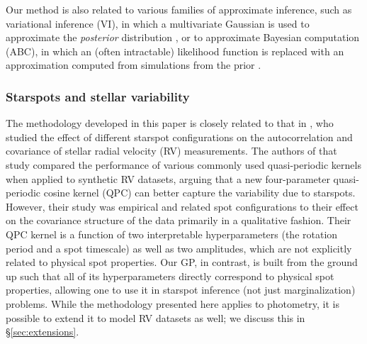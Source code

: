 \documentclass[modern,linenumbers]{aastex62}
\begin{document}
Our method is also related to various families of approximate inference, such as
variational inference (VI), in which a multivariate Gaussian is used to
approximate the \emph{posterior} distribution \citep[e.g,][]{Blei2016},
or to approximate Bayesian
computation (ABC), in which an (often intractable) likelihood function is
replaced with an approximation computed from simulations from the prior
\citep[e.g.,][]{Beaumont2019}.

\subsubsection{Starspots and stellar variability}

The methodology developed in this paper is closely related to that in
\citet{Perger2020}, who studied the effect of different starspot
configurations on the autocorrelation and covariance of stellar
radial velocity (RV) measurements. The authors of that study compared the
performance of various commonly used quasi-periodic kernels when applied
to synthetic RV datasets, arguing that a new four-parameter quasi-periodic
cosine kernel (QPC) can better capture the variability due to starspots.
However, their study was empirical and related spot configurations to their
effect on the covariance structure of the data primarily in a qualitative
fashion. Their QPC kernel is a function of two interpretable hyperparameters
(the rotation period and a spot timescale) as well as two amplitudes, which
are not explicitly related to physical spot properties. Our GP, in contrast,
is built from the ground up such that all of its hyperparameters directly
correspond to physical spot properties, allowing one to use it in starspot
inference (not just marginalization) problems. While the methodology presented
here applies to photometry, it is possible to extend it to model RV
datasets as well; we discuss this in \S\ref{sec:extensions}.
\end{document}
